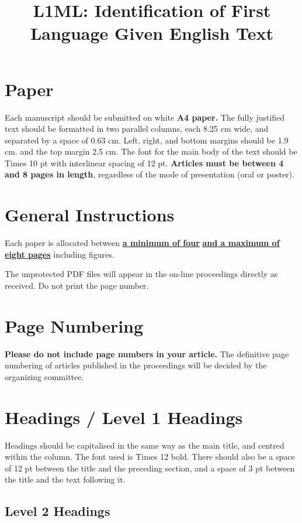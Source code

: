 \documentclass[10pt, a4paper]{article}
\title{L1ML: Identification of First Language Given English Text}
\begin{document}
\maketitleabstract

\section{Paper}

Each manuscript should be submitted on white \textbf{A4 paper.} The fully
justified text should be formatted in two parallel columns, each 8.25 cm wide,
and separated by a space of 0.63 cm. Left, right, and bottom margins should be
1.9 cm. and the top margin 2.5 cm. The font for the main body of the text should
be Times 10 pt with interlinear spacing of 12 pt.  \textbf{Articles must be
between 4 and 8 pages in length}, regardless of the mode of presentation (oral
or poster).

\section{General Instructions}

Each paper is allocated between \underline{\textbf{a mi\-ni\-mum of four}}
\textbf{\underline{and a maximum of eight pages}} including figures. %

The unprotected PDF files will appear in the on-line proceedings directly as
received. Do not print the page number.

\section{Page Numbering}

\textbf{Please do not include page numbers in your article.} The definitive page
numbering of articles published in the proceedings will be decided by the
organizing committee.

\section{Headings / Level 1 Headings}

Headings should be capitalised in the same way as the main title, and centred
within the column. The font used is Times 12 bold. There should also be a space
of 12 pt between the title and the preceding section, and a space of 3 pt
between the title and the text following it.

\subsection{Level 2 Headings}
\end{document}
